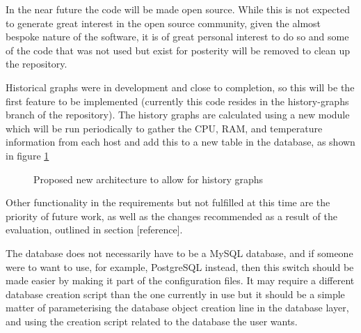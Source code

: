 In the near future the code will be made open source.
While this is not expected to generate great interest in the open source community, given the almost bespoke nature of the software, it is of great personal interest to do so and some of the code that was not used but exist for posterity will be removed to clean up the repository.

Historical graphs were in development and close to completion, so this will be the first feature to be implemented (currently this code resides in the history-graphs branch of the repository).
The history graphs are calculated using a new module which will be run periodically to gather the CPU, RAM, and temperature information from each host and add this to a new table in the database, as shown in figure \ref{fig:newArch}

\begin{figure}[t]
	\centering
	\setlength\fboxsep{0pt}
	\setlength\fboxrule{0pt}
	\caption{Proposed new architecture to allow for history graphs}
	\label{fig:newArch}
\end{figure}

Other functionality in the requirements but not fulfilled at this time are the priority of future work, as well as the changes recommended as a result of the evaluation, outlined in section [reference]. %

The database does not necessarily have to be a MySQL database, and if someone were to want to use, for example, PostgreSQL instead, then this switch should be made easier by making it part of the configuration files.
It may require a different database creation script than the one currently in use but it should be a simple matter of parameterising the database object creation line in the database layer, and using the creation script related to the database the user wants.